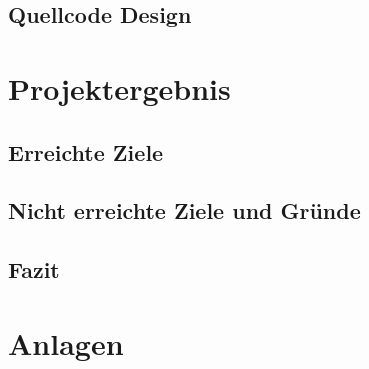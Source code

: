 \documentclass[a4paper, 11pt]{scrartcl}
\begin{document}
\subsection{Quellcode Design}



\section{Projektergebnis}
\subsection{Erreichte Ziele}


\subsection{Nicht erreichte Ziele und Gründe}


\subsection{Fazit}
\newpage
\section{Anlagen}
\end{document}
